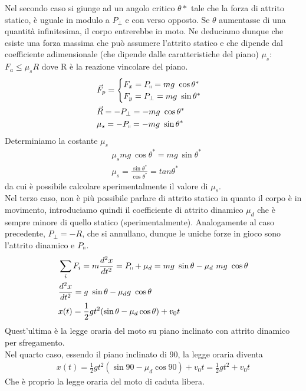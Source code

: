 \documentclass[10pt,a4paper]{article}
\begin{document}
Nel secondo caso si giunge ad un angolo critico $\theta*$ tale che la forza di attrito statico, è uguale in modulo a $P_\perp$ e con verso opposto. Se $\theta$ aumentasse di una quantità infinitesima, il corpo entrerebbe in moto. Ne deduciamo dunque che esiste una forza massima che può assumere l'attrito statico e che dipende dal coefficiente adimensionale (che dipende dalle caratteristiche del piano) $\mu_s$: $F_a\leq \mu_s R$ dove R è la reazione vincolare del piano.
\begin{align*}
&\vec{F}_p =
\begin{cases}
F_x=P_\shortparallel= mg\ \cos\theta^*\\
F_y=P_\perp=mg\ \sin\theta^*
\end{cases}\\
&\vec{R} = - P_\perp = - mg\ \cos\theta^*\\
&\mu_s=-P_\shortparallel=-mg\ \sin\theta^*
\end{align*}
Determiniamo la costante $\mu_s$ 
\begin{align*}
&\mu_s mg\ \cos \theta^* = mg\ \sin\theta^*\\
&\mu_s=\frac{\sin\theta^*}{\cos\theta^*}=tan\theta^*
\end{align*}
da cui è possibile calcolare sperimentalmente il valore di $\mu_s$.\\
Nel terzo caso, non è più possibile parlare di attrito statico in quanto il corpo è in movimento, introduciamo quindi il coefficiente di attrito dinamico $\mu_d$ che è sempre minore di quello statico (sperimentalmente). Analogamente al caso precedente, $P_\perp = -R$, che si annullano, dunque le uniche forze in gioco sono l'attrito dinamico e $P_\shortparallel$.
\begin{align*}
&\sum_{i} F_i= m \frac{d^2 x}{dt^2}= P_\shortparallel+\mu_d= mg\ \sin\theta-\mu_d\ m g\ \cos\theta\\
&\frac{d^2 x}{dt^2}=g\ \sin\theta-\mu_d g\ \cos\theta\\
&x(t) = \frac{1}{2} gt^2 (\sin\theta-\mu_d\cos\theta)+v_0t
\end{align*}
Quest'ultima è la legge oraria del moto su piano inclinato con attrito dinamico per sfregamento.\\
Nel quarto caso, essendo il piano inclinato di 90\textdegree, la legge oraria diventa
\begin{align*}
x(t) = \frac{1}{2} g t^2 (\sin90-\mu_d \cos90)+v_0t = \frac{1}{2} g t^2 + v_0t
\end{align*}
Che è proprio la legge oraria del moto di caduta libera.
\end{document}
